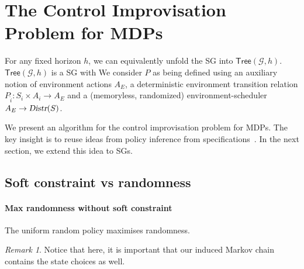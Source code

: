 \documentclass[conference]{IEEEtran}
\theoremstyle{remark}
\newtheorem{remark}{Remark}
\newcommand{\sg}{\mathcal{G}}
\newcommand{\Distr}{\ensuremath{\textsl{Distr}}}
\newcommand{\Act}{A}
\newcommand{\unrolled}[2]{\textsf{Tree}(#1,#2)}
\begin{document}
\section{The Control Improvisation Problem for MDPs}
\color{black!50}
For any fixed horizon $h$, we can equivalently unfold the SG into  $\unrolled{\sg}{h}$. $\unrolled{\sg}{h}$ is a SG with 
We consider $P$ as being defined using an auxiliary notion of environment actions $\Act_E$, a deterministic environment transition relation $P_{\hat{i}}\colon S_i \times \Act_i \rightarrow A_E$ and a (memoryless, randomized) environment-scheduler $A_E \rightarrow \Distr(S)$.

\color{black}

We present an algorithm for the control improvisation problem for MDPs. The key insight is to reuse ideas from policy inference from specifications~\cite{DBLP:conf/cav/Vazquez-Chanlatte20}.
In the next section, we extend this idea to SGs. 



\subsection{Soft constraint vs randomness}
\paragraph{Max randomness without soft constraint}
The uniform random policy maximises randomness.
\begin{remark}
Notice that here, it is important that our induced Markov chain contains the state choices as well.	
\end{remark}
\end{document}
